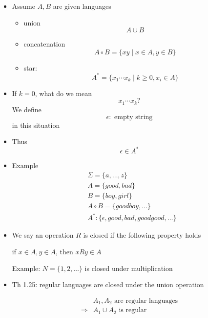 \begin{frame}[allowframebreaks]
\begin{itemize}
\item Assume $A,B$ are given languages
\begin{itemize}
\item union
  \begin{equation*}
  A \cup B
\end{equation*}
\item concatenation
  \begin{equation*}
  A\circ B=\{xy\mid x\in A, y \in B\}
\end{equation*}
\item star:
  \begin{equation*}
  A^*=\{x_1 \cdots x_k\mid
k \geq 0, x_i \in A\}
\end{equation*}
\end{itemize}
\item If $k=0$, what do we mean
  \begin{equation*}
    x_1 \cdots x_k?
  \end{equation*}
  We define
  \begin{equation*}
     \epsilon: \text{ empty string}
   \end{equation*}
in this situation
\item Thus
  \begin{equation*}
   \epsilon \in A^*
 \end{equation*}
\item Example
  \begin{equation*}
    \begin{split}
& \Sigma =\{a, \ldots, z\}\\
& A=\{good, bad\} \\
& B=\{boy,girl\} \\
& A\circ B=
\{goodboy, \ldots \}\\
& A^*: \{\epsilon, good, bad, goodgood, \ldots\}
\end{split}
\end{equation*}
\item We say an operation $R$ is \alert{closed} if the
  following property holds
  \begin{center}
if $x\in A, y \in A$, then $xRy \in A$
\end{center}
Example: $N=\{1,2,\ldots\}$ is closed under multiplication
\item Th 1.25: regular languages are closed under the union operation

  \begin{equation*}
    \begin{split}
&    A_1, A_2 \text{ are regular languages} \\
\Rightarrow & A_1 \cup A_2 \text{ is regular}
  \end{split}
\end{equation*}


\end{itemize}
\end{frame}
